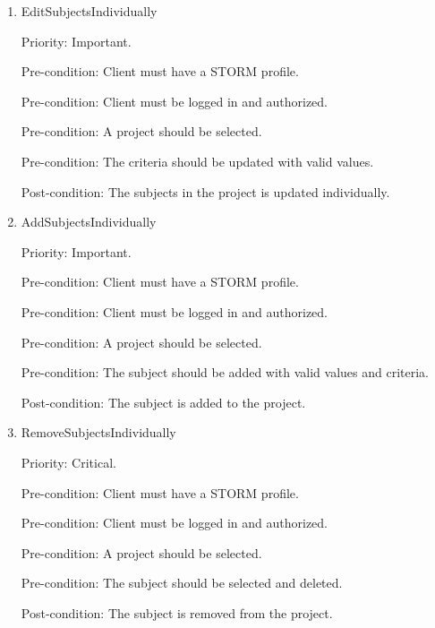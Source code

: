 \begin{enumerate}
\item EditSubjectsIndividually\par
Priority: Important.\par
Pre-condition: Client must have a STORM profile.\par
Pre-condition: Client must be logged in and authorized.\par
Pre-condition: A project should be selected.\par
Pre-condition: The criteria should be updated with valid values.\par
Post-condition: The subjects in the project is updated individually.\par

\item AddSubjectsIndividually\par
Priority: Important.\par
Pre-condition: Client must have a STORM profile.\par
Pre-condition: Client must be logged in and authorized.\par
Pre-condition: A project should be selected.\par
Pre-condition: The subject should be added with valid values and criteria.\par
Post-condition: The subject is added to the project.\par

\item RemoveSubjectsIndividually\par
Priority: Critical.\par
Pre-condition: Client must have a STORM profile.\par
Pre-condition: Client must be logged in and authorized.\par
Pre-condition: A project should be selected.\par
Pre-condition: The subject should be selected and deleted.\par
Post-condition: The subject is removed from the project.\par

\end{enumerate}

